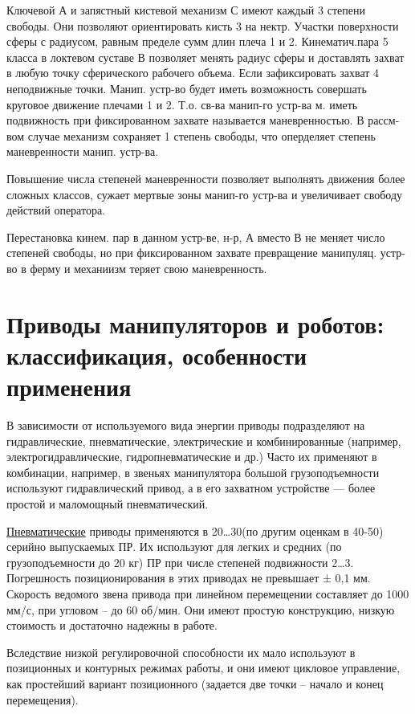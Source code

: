 \documentclass[unicode, 12pt, a4paper, oneside]{article}
\begin{document}
\begin{enumerate}
Ключевой А и запястный кистевой механизм С имеют каждый 3 степени  свободы. Они позволяют ориентировать кисть 3 на нектр. Участки поверхности сферы с радиусом, равным пределе сумм длин плеча 1 и 2.
Кинематич.пара 5 класса в локтевом суставе В позволяет менять радиус сферы и доставлять захват в любую точку сферического рабочего объема.
Если зафиксировать захват 4 неподвижные точки. Манип. устр-во будет иметь возможность совершать круговое движение плечами 1 и 2. Т.о. св-ва манип-го устр-ва м. иметь подвижность при фиксированном захвате называется маневренностью. В рассм-вом случае механизм сохраняет 1 степень свободы, что оперделяет степень маневренности манип. устр-ва.

Повышение числа степеней маневренности позволяет выполнять движения более сложных классов, сужает мертвые зоны манип-го устр-ва и увеличивает свободу действий оператора.

Перестановка кинем. пар в данном устр-ве, н-р, А вместо В не меняет число степеней свободы, но при фиксированном захвате превращение манипуляц. устр-во в ферму и механиизм теряет свою маневренность.
\end{enumerate}

\section{Приводы манипуляторов и роботов: классификация, особенности применения}

В зависимости от используемого вида энергии приводы подразделяют на гидравлические, пневматические, электрические и комбинированные (например, электрогидравлические, гидропневматические и др.) Часто их применяют в комбинации, например, в звеньях манипулятора большой грузоподъемности используют гидравлический привод, а в его захватном устройстве — более простой и маломощный пневматический.

\underline{Пневматические} приводы применяются в 20…30\textdiscount (по другим оценкам в 40-50\textdiscount) серийно выпускаемых ПР. Их используют  для легких и средних (по грузоподъемности до 20 кг) ПР при числе степеней подвижности 2…3. Погрешность позиционирования в этих приводах не превышает ± 0,1 мм. Скорость ведомого звена привода при линейном перемещении составляет до 1000 мм/с, при угловом – до 60 об/мин. Они имеют простую конструкцию, низкую стоимость и достаточно надежны в работе.

Вследствие низкой регулировочной способности их мало используют в позиционных и контурных режимах работы, и они имеют цикловое управление, как простейший вариант позиционного (задается две точки – начало и конец перемещения).
\end{document}
